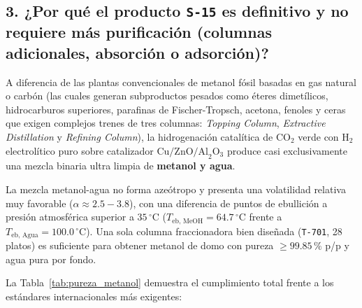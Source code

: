 \documentclass[11pt,a4paper]{article}
\begin{document}
\subsection{3. ¿Por qué el producto \texttt{S-15} es definitivo y no requiere más purificación (columnas adicionales, absorción o adsorción)?}
A diferencia de las plantas convencionales de metanol fósil basadas en gas natural o carbón (las cuales generan subproductos pesados como éteres dimetílicos, hidrocarburos superiores, parafinas de Fischer-Tropsch, acetona, fenoles y ceras que exigen complejos trenes de tres columnas: \textit{Topping Column}, \textit{Extractive Distillation} y \textit{Refining Column}), la hidrogenación catalítica de $\text{CO}_2$ verde con $\text{H}_2$ electrolítico puro sobre catalizador $\text{Cu/ZnO/Al}_2\text{O}_3$ produce casi exclusivamente una mezcla binaria ultra limpia de \textbf{metanol y agua}.

La mezcla metanol-agua no forma azeótropo y presenta una volatilidad relativa muy favorable ($\alpha \approx 2.5 - 3.8$), con una diferencia de puntos de ebullición a presión atmosférica superior a $35\,^\circ\text{C}$ ($T_{\text{eb, MeOH}} = 64.7\,^\circ\text{C}$ frente a $T_{\text{eb, Agua}} = 100.0\,^\circ\text{C}$). Una sola columna fraccionadora bien diseñada (\texttt{T-701}, 28 platos) es suficiente para obtener metanol de domo con pureza $\ge 99.85\,\%$ p/p y agua pura por fondo.

La Tabla~\ref{tab:pureza_metanol} demuestra el cumplimiento total frente a los estándares internacionales más exigentes:
\end{document}

